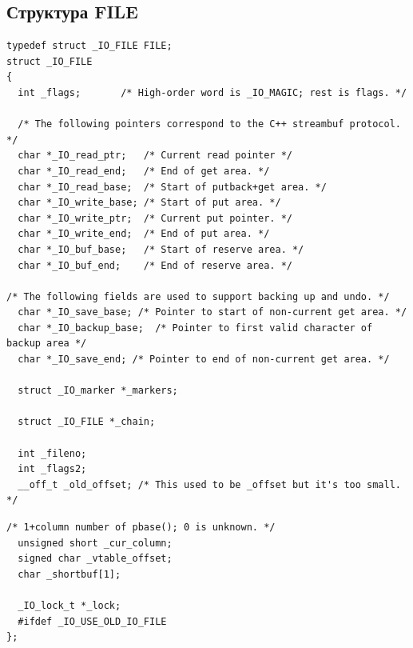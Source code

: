 \setcounter{page}{2}

\subsection*{Структура FILE}
\begin{center}
	\captionsetup{justification=raggedright,singlelinecheck=off}

	\begin{lstlisting}[label=lst:file-1,caption=Структура FILE, часть 1]
		typedef struct _IO_FILE FILE;
struct _IO_FILE
{
  int _flags;		/* High-order word is _IO_MAGIC; rest is flags. */

  /* The following pointers correspond to the C++ streambuf protocol. */
  char *_IO_read_ptr;	/* Current read pointer */
  char *_IO_read_end;	/* End of get area. */
  char *_IO_read_base;	/* Start of putback+get area. */
  char *_IO_write_base;	/* Start of put area. */
  char *_IO_write_ptr;	/* Current put pointer. */
  char *_IO_write_end;	/* End of put area. */
  char *_IO_buf_base;	/* Start of reserve area. */
  char *_IO_buf_end;	/* End of reserve area. */

/* The following fields are used to support backing up and undo. */
  char *_IO_save_base; /* Pointer to start of non-current get area. */
  char *_IO_backup_base;  /* Pointer to first valid character of backup area */
  char *_IO_save_end; /* Pointer to end of non-current get area. */

  struct _IO_marker *_markers;

  struct _IO_FILE *_chain;

  int _fileno;
  int _flags2;
  __off_t _old_offset; /* This used to be _offset but it's too small.  */
	\end{lstlisting}
\end{center}

\clearpage

\begin{center}
	\captionsetup{justification=raggedright,singlelinecheck=off}

	\begin{lstlisting}[label=lst:file-2,caption=Структура FILE, часть 2]
/* 1+column number of pbase(); 0 is unknown. */
  unsigned short _cur_column;
  signed char _vtable_offset;
  char _shortbuf[1];

  _IO_lock_t *_lock;
  #ifdef _IO_USE_OLD_IO_FILE
};
	\end{lstlisting}
\end{center}

